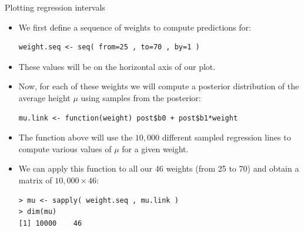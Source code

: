 \documentclass[handout]{beamer}
\begin{document}
\begin{frame}[fragile]{Plotting regression intervals}
\scriptsize{
\begin{itemize}


\item We first define a sequence of weights to compute predictions for:

\begin{verbatim}
weight.seq <- seq( from=25 , to=70 , by=1 ) 
\end{verbatim}

\item These values will be on the horizontal axis of our plot.

\item Now, for each of these weights we will compute a posterior distribution of the average height $\mu$ using samples from the posterior:

\begin{verbatim}
mu.link <- function(weight) post$b0 + post$b1*weight
\end{verbatim}

\item The function above will use the $10,000$ different sampled regression lines to compute various values of $\mu$ for a given weight.

\item We can apply this function to all our 46 weights (from 25 to 70) and obtain a matrix of $10,000 \times 46$:

\begin{verbatim}
> mu <- sapply( weight.seq , mu.link )
> dim(mu)
[1] 10000    46 
\end{verbatim}



\end{itemize}
 

 
}
\end{frame}
\end{document}
